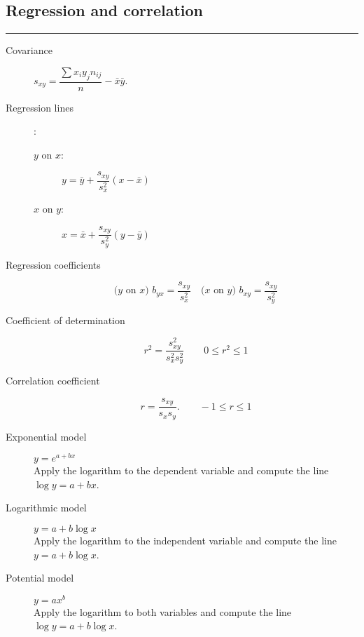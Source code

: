 \documentclass[a4paper, 10pt]{article}
\begin{document}
\subsection*{\sffamily Regression and correlation}
\begin{multicols}{2}
\begin{tcolorbox}[hbox, title=Linear regression]
\begin{varwidth}{0.4\textwidth}
	\rule{\textwidth}{0pt}
	\begin{description}
		\item [Covariance] $s_{xy}=\dfrac{\sum x_iy_jn_{ij}}{n}-\bar{x}\bar{y}$.
		\item [Regression lines]:
		\begin{description}
			\item [$y$ on $x$:] $y=\bar{y}+\dfrac{s_{xy}}{s_x^2}(x-\bar{x})$
			\item [$x$ on $y$:]	$x=\bar{x}+\dfrac{s_{xy}}{s_y^2}(y-\bar{y})$
		\end{description}
		\item [Regression coefficients]
		\[
		\mbox{($y$ on $x$) } b_{yx}=\dfrac{s_{xy}}{s_x^2}\quad \mbox{($x$ on
		$y$) } b_{xy}=\dfrac{s_{xy}}{s_y^2}
		\]
		\item[Coefficient of determination]
		\[r^2=\dfrac{s_{xy}^2}{s_x^2s_y^2} \qquad 0\leq r^2\leq 1\]

		\item[Correlation coefficient]
		\[r=\dfrac{s_{xy}}{s_xs_y}.\qquad -1\leq r\leq 1\]
	\end{description}
\end{varwidth}
\end{tcolorbox}

\medskip

\begin{tcolorbox}[hbox, title=Non-linear regression]
\begin{varwidth}{0.4\textwidth}
	\begin{description}
	  \item[Exponential model] $y=e^{a+bx}$\\
	  Apply the logarithm to the dependent variable and compute the line $\log y = a+bx$.
	  \item[Logarithmic model] $y=a+b\log x$\\
	  Apply the logarithm to the independent variable and compute the line $y=a+b\log x$.
	  \item[Potential model] $y=ax^b$\\
	  Apply the logarithm to both variables and compute the line $\log y = a+b\log x$.
	\end{description}
\end{varwidth}
\end{tcolorbox}
\end{multicols}
\end{document}
